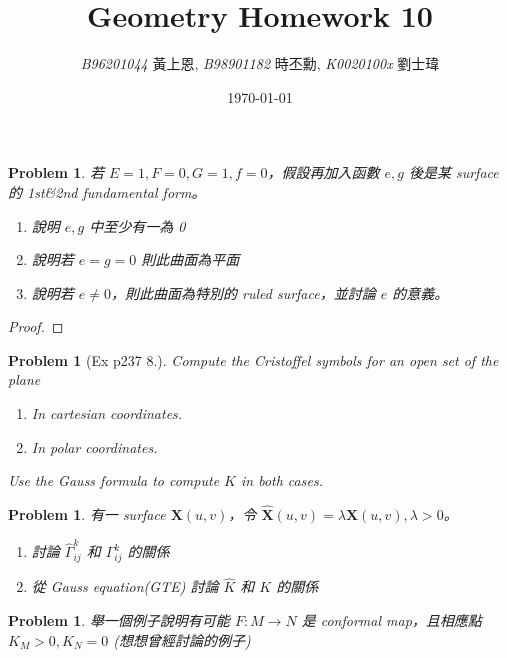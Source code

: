 \documentclass[10pt,a4paper]{article}
\newcommand{\LiHei}{\CJKfamily{lh}}
\newcounter{theProblemCounter}
\newtheorem{problem}[theProblemCounter]{Problem}
\begin{document}
\title{{Geometry Homework 10}}
\author{{\it{B96201044}} {\LiHei 黃上恩}, {\it{B98901182}} {\LiHei 時丕勳}, {\it{K0020100x}} {\LiHei 劉士瑋}}
\date{\today}
\maketitle

\newcommand{\bx}{\mathbb{X}}
\newcommand{\bfx}{\mathbf{X}}
\newcommand{\grad}{\textrm{grad }}
\newcommand{\sech}{\mbox{sech}}

\setcounter{theProblemCounter}{1}
\begin{problem} 若 $E=1, F=0, G=1, f=0$，假設再加入函數 $e, g$ 後是某 surface 的 1st\&2nd fundamental form。
\begin{enumerate}
\item[(a)] 說明 $e, g$ 中至少有一為 0
\item[(b)] 說明若 $e=g=0$ 則此曲面為平面
\item[(c)] 說明若 $e\ne 0$，則此曲面為特別的 ruled surface，並討論 $e$ 的意義。
\end{enumerate}
\end{problem}

\begin{proof}
\end{proof}

\setcounter{theProblemCounter}{3}
\begin{problem}[Ex p237 8.]
Compute the Cristoffel symbols for an open set of the plane
\begin{enumerate}
\item[(a)] In cartesian coordinates.
\item[(b)] In polar coordinates.
\end{enumerate}
Use the Gauss formula to compute $K$ in both cases.
\end{problem}

\setcounter{theProblemCounter}{5}
\begin{problem}
有一 surface $\bfx(u, v)$，令 $\hat{\bfx}(u, v)=\lambda \bfx(u,v), \lambda > 0$。
\begin{enumerate}
\item[(a)] 討論 $\hat{\Gamma}^k_{ij}$ 和 $\Gamma^k_{ij}$ 的關係
\item[(b)] 從 Gauss equation(GTE) 討論 $\hat{K}$ 和 $K$ 的關係
\end{enumerate}
\end{problem}

\setcounter{theProblemCounter}{8}
\begin{problem}
舉一個例子說明有可能 $F:M\to N$ 是 conformal map，且相應點 $K_M>0, K_N=0$ (想想曾經討論的例子)
\end{problem}
\end{document}
